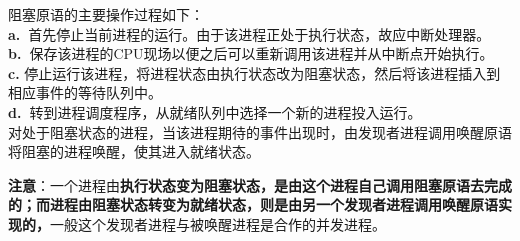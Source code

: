 {阻塞原语}{的主要操作}{过程}{如下：}\\
\textbf{a.~}首先停止当前进程的运行。由于该进程正处于执行状态，故应中断处理器。\\
\textbf{b.~}保存该进程的CPU现场以便之后可以重新调用该进程并从中断点开始执行。\\
\textbf{c.}
停止运行该进程，将进程状态由执行状态改为阻塞状态，然后将该进程插入到相应事件的等待队列中。\\
\textbf{d.~}转到进程调度程序，从就绪队列中选择一个新的进程投入运行。\\
对处于阻塞状态的进程，当该进程期待的事件出现时，由发现者进程调用唤醒原语将阻塞的进程唤醒，使其进入就绪状态。

\textbf{注意}：一个进程由\textbf{执行状态变为阻塞状态，是由这个进程自己调用阻塞原语去完成的；而进程由阻塞状态转变为就绪状态，则是由另一个发现者进程调用唤醒原语实现的，}一般这个发现者进程与被唤醒进程是合作的并发进程。
